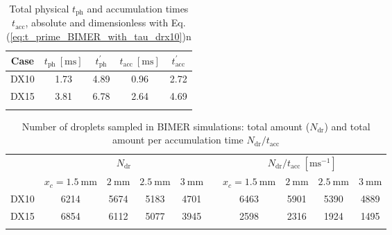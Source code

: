 
\begin{table}[!h]
\centering
\caption{Total physical $t_\mathrm{ph}$ and accumulation times $t_\mathrm{acc}$, absolute and dimensionless with Eq. (\ref{eq:t_prime_BIMER_with_tau_drx10})n}
\begin{tabular}{ccccc}
\thickhline
\textbf{Case} &  $t_\mathrm{ph}~[\mathrm{ms}]$ & $t_\mathrm{ph}^{\prime}$ & $t_\mathrm{acc}~[\mathrm{ms}]$ & $t_\mathrm{acc}^{\prime}$ \\
\hline
DX10 & 1.73 & 4.89 & 0.96 & 2.72 \\
DX15 & 3.81 & 6.78 & 2.64 &  4.69 \\
\thickhline
\end{tabular}
\label{tab:BIMER_SLI_t_prime_accumulation}
\end{table}


\clearpage

\begin{table}[!h]
\centering
\caption{Number of droplets sampled in BIMER simulations: total amount ($N_\mathrm{dr}$) and total amount per accumulation time $N_\mathrm{dr}/t_\mathrm{acc}$}
\begin{tabular}{cccccccccc}
\thickhline
\multirow{2}{*}{ \textbf{Case}}  & \multicolumn{4}{c}{$N_\mathrm{dr}$} & & \multicolumn{4}{c}{$N_\mathrm{dr}/t_\mathrm{acc}~[\mathrm{ms}^{-1}]$} \\
\cline{2-5} \cline{7-10}
& $x_c = 1.5~\mathrm{mm}$ & $2~\mathrm{mm}$ & $2.5~\mathrm{mm}$ & $3~\mathrm{mm}$ &  & $x_c = 1.5~\mathrm{mm}$ & $2~\mathrm{mm}$ & $2.5~\mathrm{mm}$ & $3~\mathrm{mm}$   \\
\thickhline 
DX10  & 6214 & 5674 & 5183 & 4701 & & 6463 & 5901 & 5390 & 4889  \\
DX15  & 6854 & 6112 & 5077 & 3945 &  & 2598 & 2316 & 1924 & 1495  \\
\thickhline
\end{tabular}
\label{tab:BIMER_SLI_Ndr_accumulated}
\end{table}



